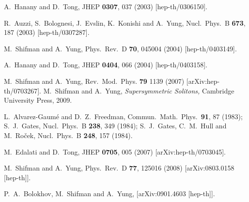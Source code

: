 \documentclass[12pt]{article}
\begin{document}
\small
\begin{thebibliography}{99}
\itemsep -2pt

A.~Hanany and D.~Tong,
JHEP {\bf 0307}, 037 (2003)
[hep-th/0306150].

R.~Auzzi, S.~Bolognesi, J.~Evslin, K.~Konishi and A.~Yung,
Nucl.\ Phys.\ B {\bf 673}, 187 (2003)
[hep-th/0307287].

M.~Shifman and A.~Yung,
Phys.\ Rev.\ D {\bf 70}, 045004 (2004)
[hep-th/0403149].

A.~Hanany and D.~Tong,
JHEP {\bf 0404}, 066 (2004)
[hep-th/0403158].

M.~Shifman and A.~Yung,
Rev.\ Mod.\ Phys. {\bf 79} 1139 (2007)
[arXiv:hep-th/0703267].
M.~Shifman and A.~Yung,
{\sl Supersymmetric Solitons,}
Cambridge University Press, 2009.

 L.~Alvarez-Gaum\'{e} and D.~Z.~Freedman,
Commun.\ Math.\ Phys.\  {\bf 91}, 87 (1983);
S.~J.~Gates,
Nucl.\ Phys.\ B {\bf 238}, 349 (1984);
S.~J.~Gates, C.~M.~Hull and M.~Ro\v{c}ek,
Nucl.\ Phys.\ B {\bf 248}, 157 (1984).

  M.~Edalati and D.~Tong,
  JHEP {\bf 0705}, 005 (2007)
  [arXiv:hep-th/0703045].

  M.~Shifman and A.~Yung,
  Phys.\ Rev.\  D {\bf 77}, 125016 (2008)
  [arXiv:0803.0158 [hep-th]].

  P.~A.~Bolokhov, M.~Shifman and A.~Yung,
  [arXiv:0901.4603 [hep-th]].
  

\end{thebibliography}
\end{document}
